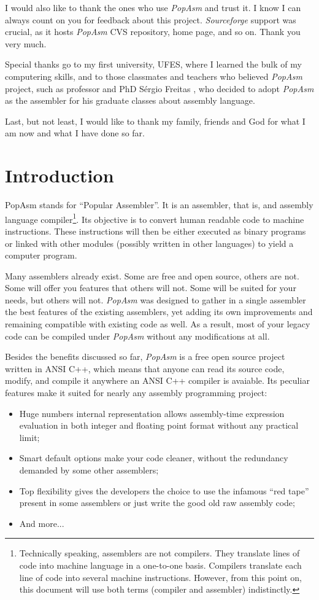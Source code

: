 \documentclass[a4paper,12pt]{book}
\begin{document}
I would also like to thank the ones who use \emph{PopAsm} and trust it. I know I can always count on you for
feedback about this project. \emph{Sourceforge} support was crucial, as it hosts \emph{PopAsm} CVS repository,
home page, and so on. Thank you very much.

Special thanks go to my first university, UFES\cite{UFES}, where I learned the bulk of my computering skills, and
to those classmates and teachers who believed \emph{PopAsm} project, such as professor and PhD S\'ergio Freitas%
\cite{FREITAS}, who decided to adopt \emph{PopAsm} as the assembler for his graduate classes about assembly
language.

Last, but not least, I would like to thank my family, friends and God for what I am now and what I have done so far.

\chapter{Introduction}
PopAsm stands for ``Popular Assembler''. It is an assembler, that is, and assembly language compiler\footnote{Technically
speaking, assemblers are not compilers. They translate lines of code into machine language in a one-to-one basis. Compilers
translate each line of code into several machine instructions. However, from this point on, this document will use both
terms (compiler and assembler) indistinctly.}. Its objective is to convert human readable code to machine instructions.
These instructions will then be either executed as binary programs or linked with other modules (possibly written in
other languages) to yield a computer program.

Many assemblers already exist. Some are free and open source, others are not. Some will offer you features that others
will not. Some will be suited for your needs, but others will not. \emph{PopAsm} was designed to gather in a single
assembler the best features of the existing assemblers, yet adding its own improvements and remaining compatible with
existing code as well. As a result, most of your legacy code can be compiled under \emph{PopAsm} without any modifications
at all.

Besides the benefits discussed so far, \emph{PopAsm} is a free open source project written in ANSI C++, which means
that anyone can read its source code, modify, and compile it anywhere an ANSI C++ compiler is avaiable. Its peculiar
features make it suited for nearly any assembly programming project:

\begin{itemize}
	\item{Huge numbers internal representation} allows assembly-time expression evaluation in both integer and floating
		point format without any practical limit;
   \item{Smart default options} make your code cleaner, without the redundancy demanded by some other assemblers;
	\item{Top flexibility} gives the developers the choice to use the infamous ``red tape'' present in some assemblers
		or just write the good old raw assembly code;
	\item{And more...}
\end{itemize}
\end{document}
